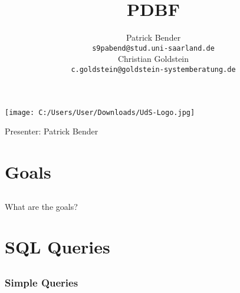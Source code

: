 \documentclass[10pt]{beamer}
\title{PDBF}
\author{
 Patrick Bender\\
  \texttt{s9pabend@stud.uni-saarland.de}
  \\[5pt]
 Christian Goldstein\\
  \texttt{c.goldstein@goldstein-systemberatung.de}
}
\date{}
\begin{document}
\begin{frame}
\vspace{-1.0cm}
\titlepage
\vspace{-2.5cm}
\begin{center}
\texttt{[image: C:/Users/User/Downloads/UdS-Logo.jpg]}
\end{center}
Presenter: Patrick Bender
\end{frame}

\section{Goals} 
\subsection*{}
\vspace{1.0cm}
\begin{frame}
	\begin{Large}\begin{center}What are the goals?\end{center}\end{Large}
\end{frame}

\section{SQL Queries} 
\subsection*{}
\begin{frame}\frametitle{Simple Queries} 
	\\[12pt]
	\\[12pt]
	\\
\end{frame}
\end{document}
